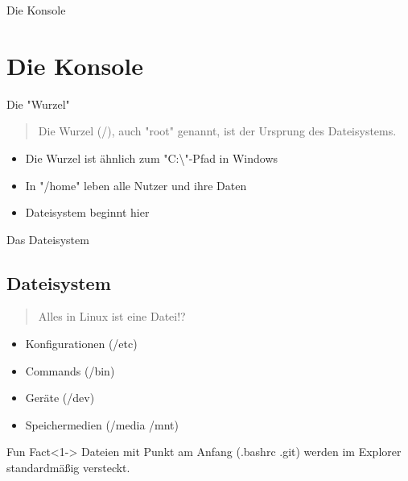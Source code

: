 
\begin{frame}{Die Konsole}
    \section{Die Konsole}\label{sec:die-konsole}
\end{frame}

\begin{frame}{Die "Wurzel"}

    \begin{quote}
        Die Wurzel (/), auch "root" genannt, ist der Ursprung des Dateisystems.
    \end{quote}
    \pause

    \begin{itemize}
        \item Die Wurzel ist ähnlich zum "C:\textbackslash"-Pfad in Windows\pause
        \item In "/home" leben alle Nutzer und ihre Daten\pause
        \item Dateisystem beginnt hier
    \end{itemize}

\end{frame}

\begin{frame}{Das Dateisystem}
    \subsection{Dateisystem}\label{subsec:dateisystem}

    \begin{quote}
        Alles in Linux ist eine Datei!?
    \end{quote}


    \begin{itemize}
        \item<2-> Konfigurationen (/etc)
        \item<3-> Commands (/bin)
        \item<4-> Geräte (/dev)
        \item<5-> Speichermedien (/media /mnt)
    \end{itemize}

    \vspace{0.5cm}
    \begin{exampleblock}{Fun Fact}<1->
        Dateien mit Punkt am Anfang (.bashrc .git) werden im Explorer standardmäßig versteckt.
    \end{exampleblock}
\end{frame}

